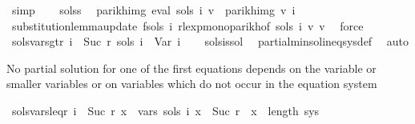 \begin{isabellebody}
\ simp\isanewline
\ \ \isamarkupfalse%
\ sols{\isacharunderscore}{\kern0pt}s{}\ \isamarkupfalse%
\ {\isachardoublequoteopen}parikh{\isacharunderscore}{\kern0pt}img\ {\isacharparenleft}{\kern0pt}eval\ {\isacharparenleft}{\kern0pt}sols{\isacharprime}{\kern0pt}\ i{\isacharparenright}{\kern0pt}\ v{}{\isacharparenright}{\kern0pt}\ {\isasymsubseteq}\ parikh{\isacharunderscore}{\kern0pt}img\ {\isacharparenleft}{\kern0pt}v{}\ i{\isacharparenright}{\kern0pt}{\isachardoublequoteclose}\isanewline
\ \ \ \ \isamarkupfalse%
\ substitution{\isacharunderscore}{\kern0pt}lemma{\isacharunderscore}{\kern0pt}update{\isacharbrackleft}{\kern0pt}\ f{\isacharequal}{\kern0pt}{\isachardoublequoteopen}sols\ i{\isachardoublequoteclose}{\isacharbrackright}{\kern0pt}\ rlexp{\isacharunderscore}{\kern0pt}mono{\isacharunderscore}{\kern0pt}parikh{\isacharbrackleft}{\kern0pt}of\ {\isachardoublequoteopen}sols\ i{\isachardoublequoteclose}\ {\isacharquery}{\kern0pt}v{\isacharprime}{\kern0pt}\ v{}{\isacharbrackright}{\kern0pt}\ \isamarkupfalse%
\ force\isanewline
{}\isamarkupfalse%
%
\endisatagproof
{\isafoldproof}%
%
\isadelimproof
\isanewline
%
\endisadelimproof
\isanewline
\isanewline
{}\isamarkupfalse%
\ sols{\isacharprime}{\kern0pt}{\isacharunderscore}{\kern0pt}vars{\isacharunderscore}{\kern0pt}gt{\isacharunderscore}{\kern0pt}r{\isacharcolon}{\kern0pt}\ {\isachardoublequoteopen}{\isasymforall}i\ {\isasymge}\ Suc\ r{\isachardot}{\kern0pt}\ sols{\isacharprime}{\kern0pt}\ i\ {\isacharequal}{\kern0pt}\ Var\ i{\isachardoublequoteclose}\isanewline
%
\isadelimproof
\ \ %
\endisadelimproof
%
\isatagproof
{}\isamarkupfalse%
\ sols{\isacharunderscore}{\kern0pt}is{\isacharunderscore}{\kern0pt}sol\ \isamarkupfalse%
\ partial{\isacharunderscore}{\kern0pt}min{\isacharunderscore}{\kern0pt}sol{\isacharunderscore}{\kern0pt}ineq{\isacharunderscore}{\kern0pt}sys{\isacharunderscore}{\kern0pt}def\ \isamarkupfalse%
\ auto%
\endisatagproof
{\isafoldproof}%
%
\isadelimproof
%
\endisadelimproof
%
\begin{isamarkuptext}%
No partial solution for one of the first  equations depends on the variable  or 
smaller variables or on variables which do not occur in the equation system%
\end{isamarkuptext}\isamarkuptrue%
\isamarkupfalse%
\ sols{\isacharprime}{\kern0pt}{\isacharunderscore}{\kern0pt}vars{\isacharunderscore}{\kern0pt}leq{\isacharunderscore}{\kern0pt}r{\isacharcolon}{\kern0pt}\ {\isachardoublequoteopen}{\isasymforall}i\ {\isacharless}{\kern0pt}\ Suc\ r{\isachardot}{\kern0pt}\ {\isasymforall}x\ {\isasymin}\ vars\ {\isacharparenleft}{\kern0pt}sols{\isacharprime}{\kern0pt}\ i{\isacharparenright}{\kern0pt}{\isachardot}{\kern0pt}\ x\ {\isasymge}\ Suc\ r\ {\isasymand}\ x\ {\isacharless}{\kern0pt}\ length\ sys{\isachardoublequoteclose}\isanewline

\end{isabellebody}
